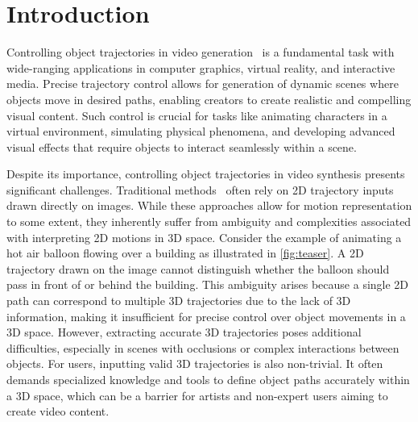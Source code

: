 \section{Introduction}\label{sec:intro}

Controlling object trajectories in video generation~\cite{Motionctrl, DragNUWA, DragAnything, TrackGo} is a fundamental task with wide-ranging applications in computer graphics, virtual reality, and interactive media. Precise trajectory control allows for generation of dynamic scenes where objects move in desired paths, enabling creators to create realistic and compelling visual content. Such control is crucial for tasks like animating characters in a virtual environment, simulating physical phenomena, and developing advanced visual effects that require objects to interact seamlessly within a scene.

Despite its importance, controlling object trajectories in video synthesis presents significant challenges. Traditional methods~\cite{DragNUWA, DragAnything, TrackGo} often rely on 2D trajectory inputs drawn directly on images. While these approaches allow for motion representation to some extent, they inherently suffer from ambiguity and complexities associated with interpreting 2D motions in 3D space. Consider the example of animating a hot air balloon flowing over a building as illustrated in \cref{fig:teaser}. A 2D trajectory drawn on the image cannot distinguish whether the balloon should pass in front of or behind the building. This ambiguity arises because a single 2D path can correspond to multiple 3D trajectories due to the lack of 3D information, making it insufficient for precise control over object movements in a 3D space. However, extracting accurate 3D trajectories poses additional difficulties, especially in scenes with occlusions or complex interactions between objects.  For users, inputting valid 3D trajectories is also non-trivial. It often demands specialized knowledge and tools to define object paths accurately within a 3D space, which can be a barrier for artists and non-expert users aiming to create video content.

